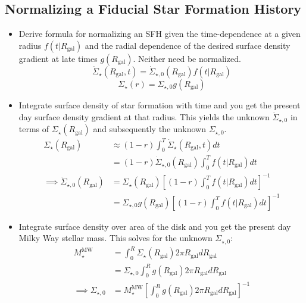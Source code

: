 \documentclass[a4paper, fleqn, usenatbib, useAMS]{mnras}
\begin{document}
\newpage 
\begin{appendices} 

\section{Normalizing a Fiducial Star Formation History} 
\label{sec:normalize_sfh} 
\begin{itemize} 
	\item Derive formula for normalizing an SFH given the time-dependence at 
	a given radius $f(t|R_\text{gal})$ and the radial dependence of the 
	desired surface density gradient at late times $g(R_\text{gal})$. Neither 
	need be normalized. 
	\begin{equation} 
	\dot{\Sigma}_\star(R_\text{gal}, t) = \dot{\Sigma}_{\star,0}(R_\text{gal}) 
	f(t|R_\text{gal}) 
	\end{equation} 
	\begin{equation} 
	\Sigma_\star(r) = \Sigma_{\star,0} g(R_\text{gal}) 
	\end{equation} 

	\item Integrate surface density of star formation with time and you get 
	the present day surface density gradient at that radius. This yields the 
	unknown $\dot{\Sigma}_{\star,0}$ in terms of $\Sigma_\star(R_\text{gal})$ 
	and subsequently the unknown $\Sigma_{\star,0}$. 
	\begin{subequations}\begin{align} 
	\Sigma_\star(R_\text{gal}) 
	&\approx (1 - r) \int_0^T \dot{\Sigma}_\star(R_\text{gal}, t) dt \\ 
	&= (1 - r) \dot{\Sigma}_{\star,0}(R_\text{gal}) \int_0^T f(t|R_\text{gal}) 
	dt \\ 
	\implies \dot{\Sigma}_{\star,0}(R_\text{gal}) &= 
	\Sigma_\star(R_\text{gal}) \left[(1 - r)\int_0^T f(t|R_\text{gal}) dt
	\right]^{-1} \\ 
	&= \Sigma_{\star,0}g(R_\text{gal}) \left[(1 - r) \int_0^T f(t|R_\text{gal}) 
	dt\right]^{-1} 
	\end{align}\end{subequations} 

	\item Integrate surface density over area of the disk and you get the 
	present day Milky Way stellar mass. This solves for the unknown 
	$\Sigma_{\star,0}$: 
	\begin{subequations}\begin{align} 
	M_\star^\text{MW} &= \int_0^R \Sigma_\star(R_\text{gal}) 2\pi R_\text{gal} 
	dR_\text{gal} \\ 
	&= \Sigma_{\star,0}\int_0^R g(R_\text{gal}) 2\pi R_\text{gal} dR_\text{gal} 
	\\ 
	\implies \Sigma_{\star,0} &= M_\star^\text{MW} 
	\left[\int_0^R g(R_\text{gal}) 2\pi R_\text{gal}dR_\text{gal}\right]^{-1} 
	\end{align}\end{subequations} 


\end{itemize}
\end{appendices}
\end{document}
